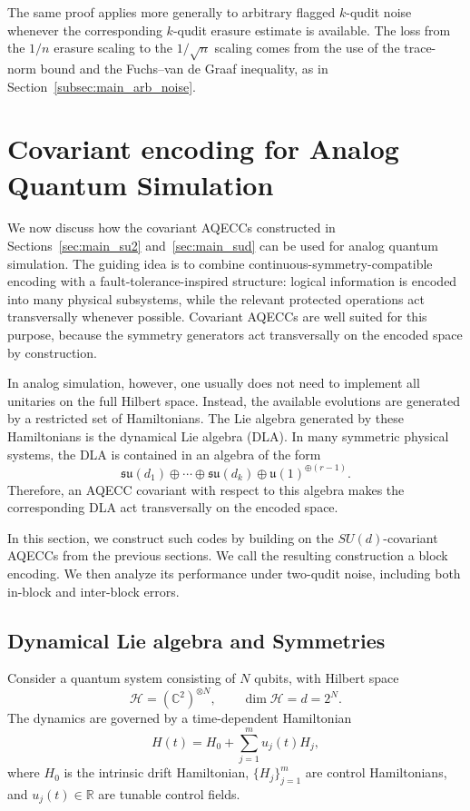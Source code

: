 \documentclass[10pt,twocolumn,superscriptaddress,aps,amsmath,amssymb,citeautoscript,floatfix,prx,longbibliography]{revtex4-2}
\newcounter{alg}
\theoremstyle{plain}
\theoremstyle{plain}
\theoremstyle{plain}
\theoremstyle{plain}
\theoremstyle{plain}
\theoremstyle{plain}
\begin{document}
The same proof applies more generally to arbitrary flagged $k$-qudit noise whenever the corresponding $k$-qudit erasure estimate is available. The loss from the $1/n$ erasure scaling to the $1/\sqrt n$ scaling comes from the use of the trace-norm bound and the Fuchs--van de Graaf inequality, as in Section~\ref{subsec:main_arb_noise}.

\section{Covariant encoding for Analog Quantum Simulation}\label{sec:main_covar_analog}

We now discuss how the covariant AQECCs constructed in Sections~\ref{sec:main_su2} and~\ref{sec:main_sud} can be used for analog quantum simulation. The guiding idea is to combine continuous-symmetry-compatible encoding with a fault-tolerance-inspired structure: logical information is encoded into many physical subsystems, while the relevant protected operations act transversally whenever possible. Covariant AQECCs are well suited for this purpose, because the symmetry generators act transversally on the encoded space by construction.

In analog simulation, however, one usually does not need to implement all unitaries on the full Hilbert space. Instead, the available evolutions are generated by a restricted set of Hamiltonians. The Lie algebra generated by these Hamiltonians is the dynamical Lie algebra (DLA). In many symmetric physical systems, the DLA is contained in an algebra of the form
$$
    \mathfrak{su}(d_1)
    \oplus
    \cdots
    \oplus
    \mathfrak{su}(d_k)
    \oplus
    \mathfrak{u}(1)^{\oplus(r-1)} .
$$
Therefore, an AQECC covariant with respect to this algebra makes the corresponding DLA act transversally on the encoded space.

In this section, we construct such codes by building on the $SU(d)$-covariant AQECCs from the previous sections. We call the resulting construction a block encoding. We then analyze its performance under two-qudit noise, including both in-block and inter-block errors.

\subsection{Dynamical Lie algebra and Symmetries}\label{subsec:main_DLA}

Consider a quantum system consisting of $N$ qubits, with Hilbert space
$$
    \mathcal H=(\mathbb C^2)^{\otimes N},
    \qquad
    \dim\mathcal H=d=2^N .
$$
The dynamics are governed by a time-dependent Hamiltonian
\begin{equation}\label{eq:system_ham}
    H(t)
    =
    H_0
    +
    \sum_{j=1}^m u_j(t)H_j,
\end{equation}
where $H_0$ is the intrinsic drift Hamiltonian, $\{H_j\}_{j=1}^m$ are control Hamiltonians, and $u_j(t)\in\mathbb R$ are tunable control fields.
\end{document}
